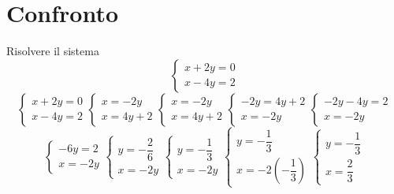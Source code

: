\section{Confronto}
\begin{exercise}{}
	Risolvere il sistema 
	\[
	\begin{cases}
		x+2y=0\\
		x-4y=2
	\end{cases}
	\]
	\tcblower
	\[
	\begin{cases}
		x+2y=0\\
	x-4y=2
	\end{cases}
	\begin{cases}
		x=-2y\\
	x=4y+2
	\end{cases}
	\begin{cases}
		x=-2y\\
	x=4y+2
	\end{cases}
	\begin{cases}
		-2y=4y+2\\
		x=-2y
	\end{cases}
\begin{cases}
	-2y-4y=2\\
	x=-2y
\end{cases}
\]
	\[
	\begin{cases}
		-6y=2\\
		x=-2y
	\end{cases}
	\begin{cases}
		y=-\dfrac{2}{6}\\
		x=-2y
	\end{cases}
	\begin{cases}
	y=-\dfrac{1}{3}\\
	x=-2y
	\end{cases}
\begin{cases}
	y=-\dfrac{1}{3}\\
	x=-2(-\dfrac{1}{3})
\end{cases}
\begin{cases}
	y=-\dfrac{1}{3}\\
	x=\dfrac{2}{3}
\end{cases}
	\]
\end{exercise}

